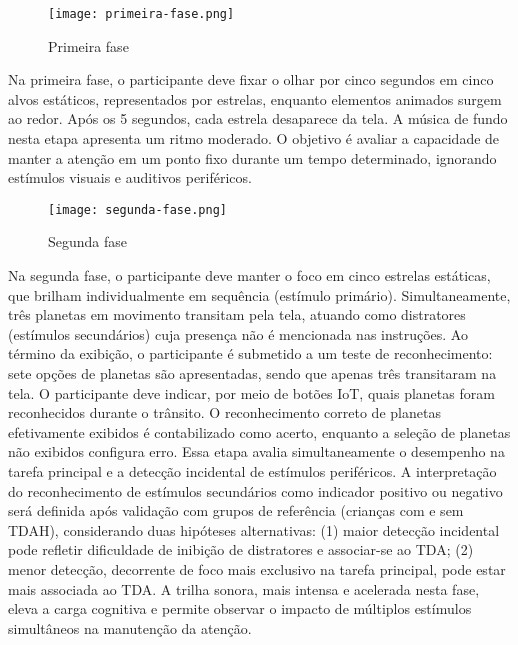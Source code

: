 \begin{figure}[H]
    \centering
    \caption{Primeira fase}%
    \label{fig:primeira-fase}
    \texttt{[image: primeira-fase.png]}%
\end{figure}

Na primeira fase, o participante deve fixar o olhar por cinco segundos em cinco alvos estáticos,
representados por estrelas, enquanto elementos animados surgem ao redor. Após os 5 segundos,
cada estrela desaparece da tela. A música de fundo nesta etapa apresenta um ritmo moderado. O
objetivo é avaliar a capacidade de manter a atenção em um ponto fixo durante um tempo determinado, ignorando estímulos visuais e auditivos periféricos.

\begin{figure}[H]
    \centering
    \caption{Segunda fase}%
    \label{fig:segunda-fase}
    \texttt{[image: segunda-fase.png]}%
\end{figure}

Na segunda fase, o participante deve manter o foco em cinco estrelas estáticas, que brilham individualmente em sequência (estímulo primário). Simultaneamente, três planetas em movimento transitam pela tela, atuando como distratores (estímulos secundários) cuja presença não é mencionada nas instruções. Ao término da exibição, o participante é submetido a um teste de reconhecimento: sete opções de planetas são apresentadas, sendo que apenas três transitaram na tela. O participante deve indicar, por meio de botões IoT, quais planetas foram reconhecidos durante o trânsito. O reconhecimento correto de planetas efetivamente exibidos é contabilizado como acerto, enquanto a seleção de planetas não exibidos configura erro. Essa etapa avalia simultaneamente o desempenho na tarefa principal e a detecção incidental de estímulos periféricos. A interpretação do reconhecimento de estímulos secundários como indicador positivo ou negativo será definida após validação com grupos de referência (crianças com e sem TDAH), considerando duas hipóteses alternativas: (1) maior detecção incidental pode refletir dificuldade de inibição de distratores e associar-se ao TDA; (2) menor detecção, decorrente de foco mais exclusivo na tarefa principal, pode estar mais associada ao TDA. A trilha sonora, mais intensa e acelerada nesta fase, eleva a carga cognitiva e permite observar o impacto de múltiplos estímulos simultâneos na manutenção da atenção.

